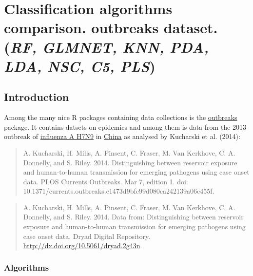 \documentclass[]{book}
\begin{document}
\hypertarget{classification-algorithms-comparison.-outbreaks-dataset.-rf-glmnet-knn-pda-lda-nsc-c5-pls}{%
\chapter{\texorpdfstring{Classification algorithms comparison. outbreaks dataset. (\emph{RF, GLMNET, KNN, PDA, LDA, NSC, C5, PLS})}{Classification algorithms comparison. outbreaks dataset. (RF, GLMNET, KNN, PDA, LDA, NSC, C5, PLS)}}\label{classification-algorithms-comparison.-outbreaks-dataset.-rf-glmnet-knn-pda-lda-nsc-c5-pls}}

\hypertarget{introduction-5}{%
\section{Introduction}\label{introduction-5}}

Among the many nice R packages containing data collections is the \href{https://mran.microsoft.com/web/packages/outbreaks/outbreaks.pdf}{outbreaks} package. It contains datsets on epidemics and among them is data from the 2013 outbreak of \href{http://www.who.int/influenza/human_animal_interface/faq_H7N9/en/}{influenza A H7N9} in \href{http://www.who.int/influenza/human_animal_interface/influenza_h7n9/ChinaH7N9JointMissionReport2013u.pdf?ua=1}{China} as analysed by Kucharski et al. (2014):

\begin{quote}
A. Kucharski, H. Mills, A. Pinsent, C. Fraser, M. Van Kerkhove, C. A. Donnelly, and S. Riley. 2014. Distinguishing between reservoir exposure and human-to-human transmission for emerging pathogens using case onset data. PLOS Currents Outbreaks. Mar 7, edition 1. doi: 10.1371/currents.outbreaks.e1473d9bfc99d080ca242139a06c455f.
\end{quote}

\begin{quote}
A. Kucharski, H. Mills, A. Pinsent, C. Fraser, M. Van Kerkhove, C. A. Donnelly, and S. Riley. 2014. Data from: Distinguishing between reservoir exposure and human-to-human transmission for emerging pathogens using case onset data. Dryad Digital Repository. \url{http://dx.doi.org/10.5061/dryad.2g43n}.
\end{quote}

\hypertarget{algorithms-1}{%
\subsection{Algorithms}\label{algorithms-1}}
\end{document}
